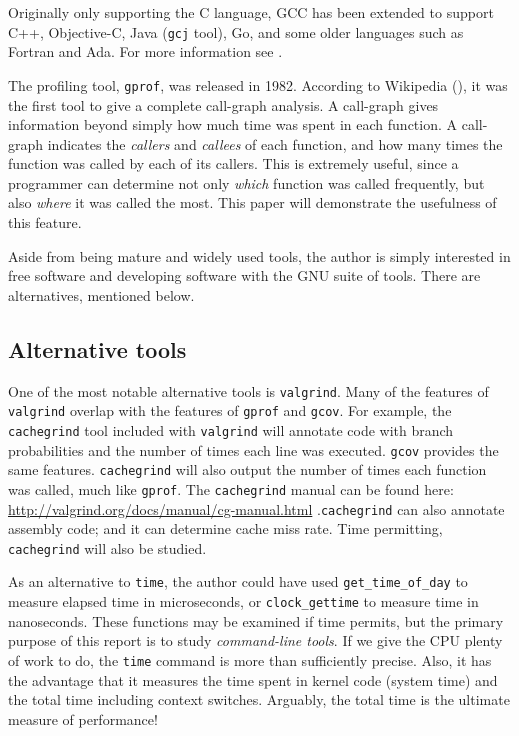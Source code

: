 \documentclass{article}
\begin{document}
Originally only supporting the C language, GCC has been extended to support C++, Objective-C, Java (\verb=gcj= tool), Go, and some older languages such as Fortran and Ada. For more information see \cite{wikiGCC}.

The profiling tool, \verb=gprof=, was released in 1982. According to Wikipedia (\cite{wikiProf}), it was the first tool to give a complete call-graph analysis. A call-graph gives information beyond simply how much time was spent in each function. A call-graph indicates the \emph{callers} and \emph{callees} of each function, and how many times the function was called by each of its callers. This is extremely useful, since a programmer can determine not only \emph{which} function was called frequently, but also \emph{where} it was called the most. This paper will demonstrate the usefulness of this feature.  

Aside from being mature and widely used tools, the author is simply interested in free software and developing software with the GNU suite of tools. There are alternatives, mentioned below. 

\subsection{Alternative tools}
One of the most notable alternative tools is \verb=valgrind=. Many of the features of \verb=valgrind= overlap with the features of \verb=gprof= and \verb=gcov=. For example, the \verb=cachegrind= tool included with \verb=valgrind= will annotate code with branch probabilities and the number of times each line was executed. \verb=gcov= provides the same features. \verb=cachegrind= will also output the number of times each function was called, much like \verb=gprof=. The \verb=cachegrind= manual can be found here: \url{http://valgrind.org/docs/manual/cg-manual.html} .\verb=cachegrind= can also annotate assembly code; and it can determine cache miss rate. Time permitting, \verb=cachegrind= will also be studied.  

As an alternative to \verb=time=, the author could have used \verb=get_time_of_day= to measure elapsed time in microseconds, or \verb=clock_gettime= to measure time in nanoseconds. These functions may be examined if time permits, but the primary purpose of this report is to study \emph{command-line tools}. If we give the CPU plenty of work to do, the \verb=time= command is more than sufficiently precise. Also, it has the advantage that it measures the time spent in kernel code (system time) and the total time including context switches. Arguably, the total time is the ultimate measure of performance!  
\end{document}
